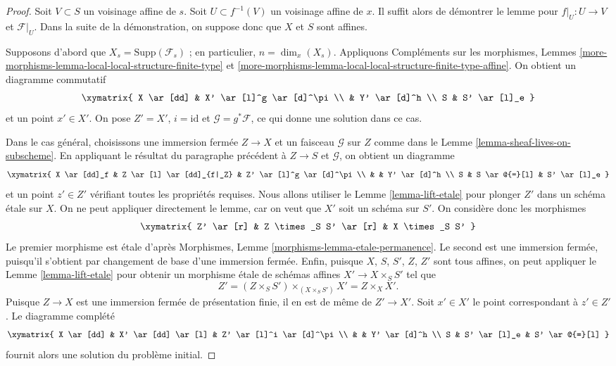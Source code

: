 \begin{proof}
Soit $V \subset S$ un voisinage affine de $s$.
Soit $U \subset f^{-1}(V)$ un voisinage affine de $x$.
Il suffit alors de démontrer le lemme pour $f|_U : U \to V$ et
$\mathcal{F}|_U$. Dans la suite de la démonstration, on suppose donc que
$X$ et $S$ sont affines.

\medskip\noindent
Supposons d'abord que $X_s = \text{Supp}(\mathcal{F}_s)$ ; en particulier,
$n = \dim_x(X_s)$. Appliquons
Compléments sur les morphismes,
Lemmes \ref{more-morphisms-lemma-local-local-structure-finite-type} et
\ref{more-morphisms-lemma-local-local-structure-finite-type-affine}.
On obtient un diagramme commutatif
$$
\xymatrix{
X \ar[dd] & X' \ar[l]^g \ar[d]^\pi \\
& Y' \ar[d]^h  \\
S & S' \ar[l]_e
}
$$
et un point $x' \in X'$. On pose $Z' = X'$, $i = \text{id}$ et
$\mathcal{G} = g^*\mathcal{F}$, ce qui donne une solution dans ce cas.

\medskip\noindent
Dans le cas général, choisissons une immersion fermée $Z \to X$ et un faisceau
$\mathcal{G}$ sur $Z$ comme dans
le Lemme \ref{lemma-sheaf-lives-on-subscheme}.
En appliquant le résultat du paragraphe précédent à $Z \to S$ et
$\mathcal{G}$, on obtient un diagramme
$$
\xymatrix{
X \ar[dd]_f & Z \ar[l] \ar[dd]_{f|_Z} & Z' \ar[l]^g \ar[d]^\pi \\
& & Y' \ar[d]^h \\
S & S \ar@{=}[l] & S' \ar[l]_e
}
$$
et un point $z' \in Z'$ vérifiant toutes les propriétés requises.
Nous allons utiliser
le Lemme \ref{lemma-lift-etale}
pour plonger $Z'$ dans un schéma \'etale sur $X$. On ne peut appliquer directement le lemme,
car on veut que $X'$ soit un schéma sur $S'$. On
considère donc les morphismes
$$
\xymatrix{
Z' \ar[r] & Z \times_S S' \ar[r] & X \times_S S'
}
$$
Le premier morphisme est \'etale d'après
Morphismes, Lemme \ref{morphisms-lemma-etale-permanence}.
Le second est une immersion fermée, puisqu'il s'obtient par changement de base d'une immersion fermée.
Enfin, puisque $X$, $S$, $S'$, $Z$, $Z'$ sont tous affines, on peut appliquer
le Lemme \ref{lemma-lift-etale}
pour obtenir un morphisme \'etale de schémas affines $X' \to X \times_S S'$ tel que
$$
Z' = (Z \times_S S') \times_{(X \times_S S')} X' = Z \times_X X'.
$$
Puisque $Z \to X$ est une immersion fermée de présentation finie, il en est de même de $Z' \to X'$.
Soit $x' \in X'$ le point correspondant à $z' \in Z'$.
Le diagramme complété
$$
\xymatrix{
X \ar[dd] & X' \ar[dd] \ar[l] & Z' \ar[l]^i \ar[d]^\pi \\
& & Y' \ar[d]^h \\
S & S' \ar[l]_e & S' \ar@{=}[l]
}
$$
fournit alors une solution du problème initial.
\end{proof}

